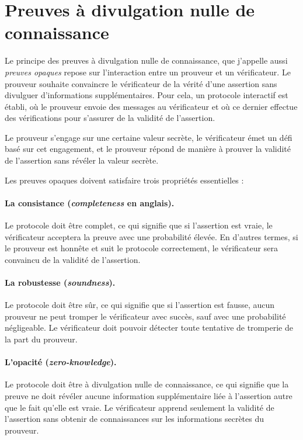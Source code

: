 
\section{Preuves à divulgation nulle de connaissance} %
\label{sec:preuves}
Le principe des preuves à divulgation nulle de connaissance, que j’appelle aussi \emph{preuves opaques} repose sur l'interaction entre un
prouveur et un vérificateur.
Le prouveur souhaite convaincre le vérificateur de la vérité d'une assertion sans divulguer
d'informations supplémentaires.
Pour cela, un protocole interactif est établi, où le prouveur envoie des messages au vérificateur et
où ce dernier effectue des vérifications pour s'assurer de la validité de l'assertion.

Le prouveur s'engage sur une certaine valeur secrète, le vérificateur émet un défi basé sur cet
engagement, et le prouveur répond de manière à prouver la validité de l'assertion sans révéler la
valeur secrète.

Les preuves opaques doivent satisfaire trois propriétés essentielles :

\paragraph{La consistance (\emph{completeness} en anglais).}

Le protocole doit être complet, ce qui signifie que si l'assertion est vraie, le vérificateur
acceptera la preuve avec une probabilité élevée.
En d'autres termes, si le prouveur est honnête et suit le protocole correctement, le vérificateur
sera convaincu de la validité de l'assertion.

\paragraph{La robustesse (\emph{soundness}).}

Le protocole doit être sûr, ce qui signifie que si l'assertion est fausse, aucun prouveur ne peut
tromper le vérificateur avec succès, sauf avec une probabilité négligeable.
Le vérificateur doit pouvoir détecter toute tentative de tromperie de la part du prouveur.

\paragraph{L’opacité (\emph{zero-knowledge}).}

Le protocole doit être à divulgation nulle de connaissance, ce qui signifie que la preuve ne doit
révéler aucune information supplémentaire liée à l'assertion autre que le fait qu'elle est
vraie.
Le vérificateur apprend seulement la validité de l'assertion sans obtenir de connaissances sur les
informations secrètes du prouveur.
\newline


